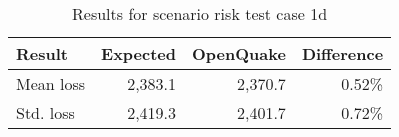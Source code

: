 \begin{table}[htbp]

\centering
\begin{tabular}{ l r r r }

\hline
\rowcolor{anti-flashwhite}
\bf{Result} & \bf{Expected} & \bf{OpenQuake} & \bf{Difference}\\
\hline
Mean loss & 2,383.1 & 2,370.7 & 0.52\% \\
Std. loss & 2,419.3 & 2,401.7 & 0.72\% \\
\hline
\end{tabular}

\caption{Results for scenario risk test case 1d}
\label{tab:result-scenario-risk-1d}
\end{table}